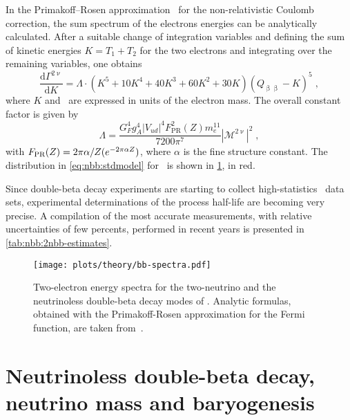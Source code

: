 In the Primakoff–Rosen approximation~\cite{Primakoff1959} for the non-relativistic Coulomb
correction, the sum spectrum of the electrons energies can be analytically calculated.
After a suitable change of integration variables and defining the sum of kinetic energies
$K=T_1+T_2$ for the two electrons and integrating over the remaining variables, one obtains
\begin{equation}\label{eq:nbb:stdmodel}
  \frac{\text{d}\Gamma^{2\upnu}}{\text{d}K} =
  \Lambda \cdot (K^5+10K^4+40K^3+60K^2+30K) {(Q_{\upbeta\upbeta}-K)}^5 \;,
\end{equation}
where $K$ and \qbb\ are expressed in units of the electron mass. The overall constant
factor is given by
\[
  \Lambda = \frac{G_F^4g_A^4|V_{ud}|^4F^2_\text{PR}(Z)m_e^{11}}{7200\pi^7}
            |\mathcal{M}^{2\upnu}|^2 \;,
\]
with $F_\text{PR}(Z) = 2\pi\alpha/Z(\-e^{-2\pi\alpha Z})$, where $\alpha$ is the fine
structure constant. The distribution in \cref{eq:nbb:stdmodel} for \gesix\ is shown in
\cref{fig:nbb:spectra}, in red.

Since double-beta decay experiments are starting to collect high-statistics \nnbb\ data
sets, experimental determinations of the process half-life are becoming very precise. A
compilation of the most accurate measurements, with relative uncertainties of few
percents, performed in recent years is presented in \cref{tab:nbb:2nbb-estimates}.

\begin{figure}
  \centering
  \texttt{[image: plots/theory/bb-spectra.pdf]}
  \caption{%
    Two-electron energy spectra for the two-neutrino and the neutrinoless
    double-beta decay modes of \gesix. Analytic formulas, obtained with the
    Primakoff-Rosen approximation for the Fermi function, are taken
    from~\cite{Tretyak1995, Tretyak2002}.
  }\label{fig:nbb:spectra}
\end{figure}

\begin{table}
  \centering
  \caption{%
    A compilation of the most precise measurements of the two-neutrino double-beta decay
    half-life for a selection of double-beta emitters.
  }\label{tab:nbb:2nbb-estimates}
  
\end{table}

\section{Neutrinoless double-beta decay, neutrino mass and baryogenesis}%
\label{sec:nbb:0nbb}

